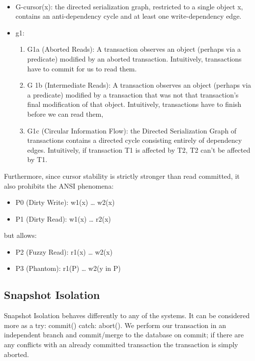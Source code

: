 \documentclass[a4paper,10pt,titlepage]{report}
\begin{document}
    \cite{Adya99weakconsistency}\\
    \begin{itemize}
        \item G-cursor(x): the directed serialization graph, restricted to a single object x, contains an anti-dependency cycle and at least one write-dependency edge.
        \item g1:
        \begin{enumerate}
            \item G1a (Aborted Reads): A transaction observes an object (perhaps via a predicate) modified by an aborted transaction. Intuitively, transactions have to commit for us to read them.
            \item G 1b (Intermediate Reads): A transaction observes an object (perhaps via a predicate) modified by a transaction that was not that transaction's final modification of that object. Intuitively, transactions have to finish before we can read them,
            \item G1c (Circular Information Flow): the Directed Serialization Graph of transactions contains a directed cycle consisting entirely of dependency edges. Intuitively, if transaction T1 is affected by T2, T2 can't be affected by T1.
        \end{enumerate}
    \end{itemize}
    Furthermore, since cursor stability is strictly stronger than read committed, it also prohibits the ANSI phenomena:
    \begin{itemize}
        \item P0 (Dirty Write): w1(x) … w2(x)
        \item P1 (Dirty Read): w1(x) … r2(x)
    \end{itemize}

    but allows:
    \begin{itemize}
        \item P2 (Fuzzy Read): r1(x) … w2(x)
        \item P3 (Phantom): r1(P) … w2(y in P)
    \end{itemize}



    \subsection{Snapshot Isolation}


    Snapshot Isolation behaves differently to any of the systems. It can be considered more as a try: commit() catch: abort(). We perform our transaction in an independent branch and commit/merge to the database on commit; if there are any conflicts with an already committed transaction the transaction is simply aborted.
\end{document}
